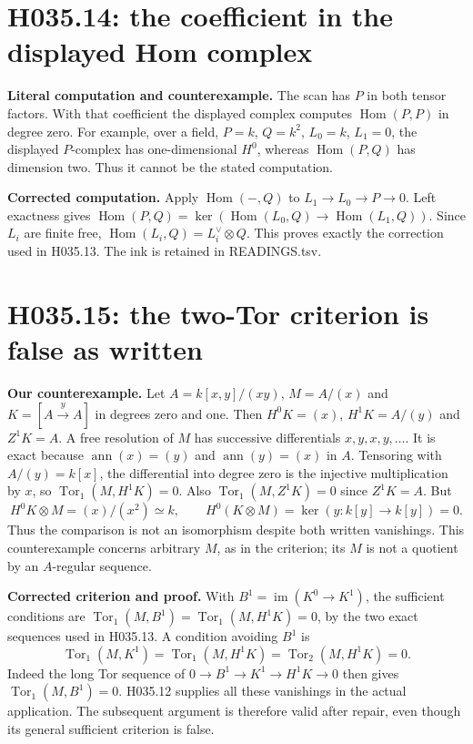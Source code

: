 \section{H035.14: the coefficient in the displayed Hom complex}
\textbf{Literal computation and counterexample.} The scan has $P$ in
both tensor factors. With that coefficient the displayed complex computes
$\operatorname{Hom}(P,P)$ in degree zero. For example, over a field,
$P=k$, $Q=k^2$, $L_0=k$, $L_1=0$, the displayed $P$-complex has
one-dimensional $H^0$, whereas $\operatorname{Hom}(P,Q)$ has dimension
two. Thus it cannot be the stated computation.

\textbf{Corrected computation.} Apply $\operatorname{Hom}(-,Q)$ to
$L_1\to L_0\to P\to0$. Left exactness gives
$\operatorname{Hom}(P,Q)=\ker(\operatorname{Hom}(L_0,Q)\to
\operatorname{Hom}(L_1,Q))$. Since $L_i$ are finite free,
$\operatorname{Hom}(L_i,Q)=L_i^\vee\otimes Q$. This proves exactly
the correction used in H035.13. The ink is retained in READINGS.tsv.

\section{H035.15: the two-Tor criterion is false as written}
\textbf{Our counterexample.} Let $A=k[x,y]/(xy)$, $M=A/(x)$ and
$K=[A\xrightarrow{y}A]$ in degrees zero and one. Then
$H^0K=(x)$, $H^1K=A/(y)$ and $Z^1K=A$. A free resolution of $M$
has successive differentials $x,y,x,y,\ldots$. It is exact because
$\operatorname{ann}(x)=(y)$ and $\operatorname{ann}(y)=(x)$ in $A$.
Tensoring with $A/(y)=k[x]$, the differential into degree zero is the
injective multiplication by $x$, so $\operatorname{Tor}_1(M,H^1K)=0$.
Also $\operatorname{Tor}_1(M,Z^1K)=0$ since $Z^1K=A$.
But
\[
 H^0K\otimes M=(x)/(x^2)\simeq k,\qquad
 H^0(K\otimes M)=\ker(y:k[y]\to k[y])=0.
\]
Thus the comparison is not an isomorphism despite both written
vanishings. This counterexample concerns arbitrary $M$, as in the
criterion; its $M$ is not a quotient by an $A$-regular sequence.

\textbf{Corrected criterion and proof.} With
$B^1=\operatorname{im}(K^0\to K^1)$, the sufficient conditions are
$\operatorname{Tor}_1(M,B^1)=\operatorname{Tor}_1(M,H^1K)=0$,
by the two exact sequences used in H035.13. A condition avoiding $B^1$
is
\[
\operatorname{Tor}_1(M,K^1)=\operatorname{Tor}_1(M,H^1K)
=\operatorname{Tor}_2(M,H^1K)=0.
\]
Indeed the long Tor sequence of $0\to B^1\to K^1\to H^1K\to0$
then gives $\operatorname{Tor}_1(M,B^1)=0$. H035.12 supplies all
these vanishings in the actual application. The subsequent argument is
therefore valid after repair, even though its general sufficient
criterion is false.

